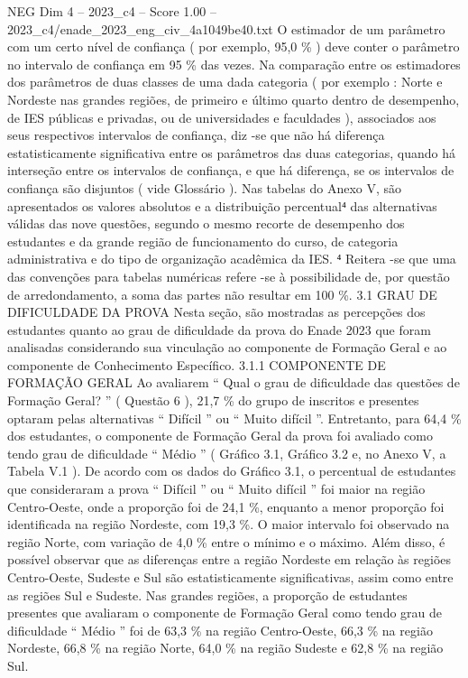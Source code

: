 \begin{textsample}{NEG Dim 4 – 2023\_c4 – Score 1.00 – 2023\_c4/enade\_2023\_eng\_civ\_4a1049be40.txt}
O estimador de um parâmetro com um certo nível de confiança ( por exemplo, 95,0 \% ) deve conter o parâmetro no intervalo de confiança em 95 \% das vezes.
Na comparação entre os estimadores dos parâmetros de duas classes de uma dada categoria ( por exemplo : Norte e Nordeste nas grandes regiões, de primeiro e último quarto dentro de desempenho, de IES públicas e privadas, ou de universidades e faculdades ), associados aos seus respectivos intervalos de confiança, diz -se que não há diferença estatisticamente significativa entre os parâmetros das duas categorias, quando há interseção entre os intervalos de confiança, e que há diferença, se os intervalos de confiança são disjuntos ( vide Glossário ).
Nas tabelas do Anexo V, são apresentados os valores absolutos e a distribuição percentual⁴ das alternativas válidas das nove questões, segundo o mesmo recorte de desempenho dos estudantes e da grande região de funcionamento do curso, de categoria administrativa e do tipo de organização acadêmica da IES. ⁴ Reitera -se que uma das convenções para tabelas numéricas refere -se à possibilidade de, por questão de arredondamento, a soma das partes não resultar em 100 \%. 3.1 GRAU DE DIFICULDADE DA PROVA Nesta seção, são mostradas as percepções dos estudantes quanto ao grau de dificuldade da prova do Enade 2023 que foram analisadas considerando sua vinculação ao componente de Formação Geral e ao componente de Conhecimento Específico. 3.1.1 COMPONENTE DE FORMAÇÃO GERAL Ao avaliarem “ Qual o grau de dificuldade das questões de Formação Geral? ” ( Questão 6 ), 21,7 \% do grupo de inscritos e presentes optaram pelas alternativas “ Difícil ” ou “ Muito difícil ”.
Entretanto, para 64,4 \% dos estudantes, o componente de Formação Geral da prova foi avaliado como tendo grau de dificuldade “ Médio ” ( Gráfico 3.1, Gráfico 3.2 e, no Anexo V, a Tabela V.1 ).
De acordo com os dados do Gráfico 3.1, o percentual de estudantes que consideraram a prova “ Difícil ” ou “ Muito difícil ” foi maior na região Centro-Oeste, onde a proporção foi de 24,1 \%, enquanto a menor proporção foi identificada na região Nordeste, com 19,3 \%.
O maior intervalo foi observado na região Norte, com variação de 4,0 \% entre o mínimo e o máximo.
Além disso, é possível observar que as diferenças entre a região Nordeste em relação às regiões Centro-Oeste, Sudeste e Sul são estatisticamente significativas, assim como entre as regiões Sul e Sudeste.
Nas grandes regiões, a proporção de estudantes presentes que avaliaram o componente de Formação Geral como tendo grau de dificuldade “ Médio ” foi de 63,3 \% na região Centro-Oeste, 66,3 \% na região Nordeste, 66,8 \% na região Norte, 64,0 \% na região Sudeste e 62,8 \% na região Sul.

\end{textsample}
